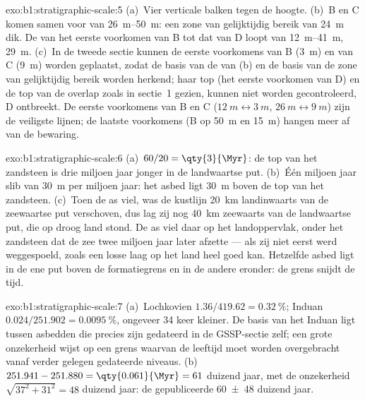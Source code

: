 \begin{solution}{exo:b1:stratigraphic-scale:5}
(a)~Vier verticale balken tegen de hoogte. (b)~B en C komen samen voor van
\qtyrange{26}{50}{m}: een zone van gelijktijdig bereik van \qty{24}{m} dik. De 
van het eerste voorkomen van B tot dat van D loopt van \qtyrange{12}{41}{m},
\qty{29}{m}. (c)~In de tweede sectie kunnen de eerste voorkomens van B (\qty{3}{m})
en van C (\qty{9}{m}) worden geplaatst, zodat de basis van de  van (b) en
de basis van de zone van gelijktijdig bereik worden herkend; haar top (het eerste
voorkomen van D) en de top van de overlap zoals in sectie~1 gezien, kunnen niet worden gecontroleerd, D ontbreekt.
De eerste voorkomens van B en C ($\qty{12}{m} \leftrightarrow
\qty{3}{m}$, $\qty{26}{m} \leftrightarrow \qty{9}{m}$) zijn de veiligste lijnen; de laatste
voorkomens (B op \qty{50}{m} en \qty{15}{m}) hangen meer af van de bewaring.
\end{solution}

\begin{solution}{exo:b1:stratigraphic-scale:6}
(a)~$60/20 = \qty{3}{\Myr}$: de top van het zandsteen is drie miljoen jaar
jonger in de landwaartse put. (b)~Één miljoen jaar slib van \qty{30}{m} per
miljoen jaar: het asbed ligt \qty{30}{m} boven de top van het zandsteen.
(c)~Toen de as viel, was de kustlijn \qty{20}{km} landinwaarts van de zeewaartse put verschoven, dus lag zij nog \qty{40}{km} zeewaarts van de landwaartse put, die op droog land stond. De as viel daar op het landoppervlak, onder het zandsteen dat de zee twee miljoen jaar later afzette --- als zij niet eerst werd weggespoeld, zoals een losse laag op het land heel goed kan. Hetzelfde asbed ligt in de ene put boven de formatiegrens en in de andere eronder: de grens snijdt de tijd.
\end{solution}

\begin{solution}{exo:b1:stratigraphic-scale:7}
(a)~Lochkovien $1.36/419.62 = \qty{0.32}{\%}$; Induan $0.024/251.902 =
\qty{0.0095}{\%}$, ongeveer 34 keer kleiner. De basis van het Induan ligt tussen asbedden die
precies zijn gedateerd in de GSSP-sectie zelf; een grote onzekerheid wijst op een grens
waarvan de leeftijd moet worden overgebracht vanaf verder gelegen gedateerde niveaus.
(b)~$251.941 - 251.880 = \qty{0.061}{\Myr} = 61$ duizend jaar, met de
onzekerheid $\sqrt{37^2 + 31^2} = 48$ duizend jaar: de gepubliceerde
\num[uncertainty-mode=separate]{60 \pm 48} duizend jaar.
\end{solution}

